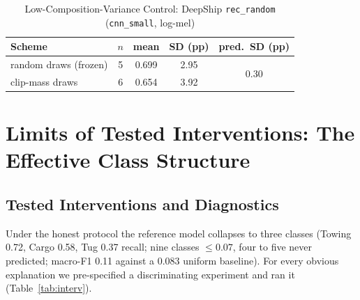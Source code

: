 ﻿\documentclass[journal]{IEEEtran}
\begin{document}
\begin{table}[!t]
\caption{Low-Composition-Variance Control: DeepShip \texttt{rec\_random} (\texttt{cnn\_small}, log-mel)}
\label{tab:control}
\centering
\begin{tabular}{lcccc}
\toprule
Scheme & $n$ & mean & SD (pp) & pred.\ SD (pp) \\
\midrule
random draws (frozen) & 5 & 0.699 & 2.95 & \multirow{2}{*}{0.30} \\
clip-mass draws       & 6 & 0.654 & 3.92 & \\
\bottomrule
\end{tabular}
\end{table}

\section{Limits of Tested Interventions: The Effective Class Structure}
\label{sec:limits}

\subsection{Tested Interventions and Diagnostics}
Under the honest protocol the reference model collapses to three classes (Towing 0.72, Cargo 0.58,
Tug 0.37 recall; nine classes $\le0.07$, four to five never predicted; macro-F1 0.11 against a 0.083
uniform baseline). For every obvious explanation we pre-specified a discriminating experiment and
ran it (Table~\ref{tab:interv}).
\end{document}
